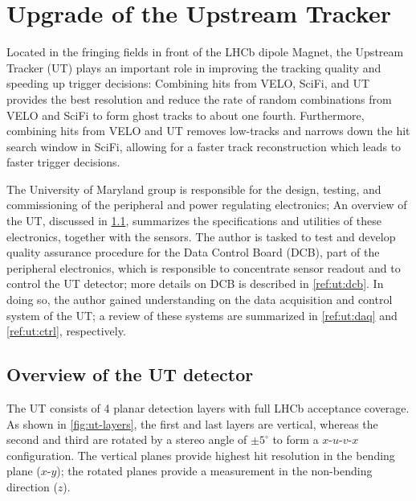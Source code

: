 \chapter{Upgrade of the Upstream Tracker}
\label{ref:ut}

Located in the fringing fields in front of the LHCb dipole Magnet,
the Upstream Tracker (UT) plays an important role in improving the tracking
quality and speeding up trigger decisions:
Combining hits from VELO, SciFi, and UT provides the best \pt resolution
and reduce the rate of random combinations from VELO and SciFi to form
ghost tracks to about one fourth.
Furthermore, combining hits from VELO and UT removes low-\pt tracks and narrows
down the hit search window in SciFi, allowing for a faster track reconstruction
which leads to faster trigger decisions.

The University of Maryland group is responsible for the design, testing, and
commissioning of the peripheral and power regulating electronics;
An overview of the UT, discussed in \cref{ref:ut:overview},
summarizes the specifications and utilities of these electronics,
together with the sensors.
The author is tasked to test and develop quality assurance procedure for
the Data Control Board (DCB),
part of the peripheral electronics,
which is responsible to concentrate sensor readout and to control the UT
detector;
more details on DCB is described in \cref{ref:ut:dcb}.
In doing so, the author gained understanding on the data acquisition and control
system of the UT;
a review of these systems are summarized in \cref{ref:ut:daq} and
\cref{ref:ut:ctrl}, respectively.


\section{Overview of the UT detector}
\label{ref:ut:overview}

The UT consists of 4 planar detection layers with full LHCb acceptance coverage.
As shown in \cref{fig:ut-layers},
the first and last layers are vertical,
whereas the second and third are rotated by a stereo angle of $\pm 5^\circ$
to form a $x$-$u$-$v$-$x$ configuration.
The vertical planes provide highest hit resolution in the bending plane
($x$-$y$);
the rotated planes provide a measurement in the non-bending direction ($z$).

